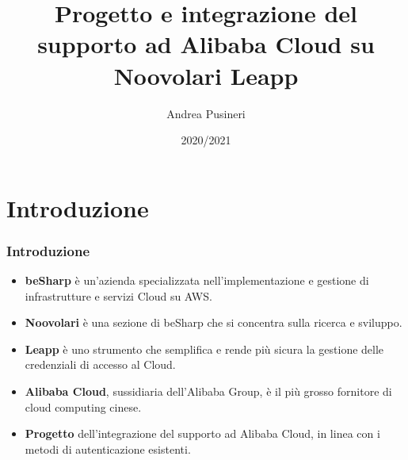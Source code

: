 \documentclass{beamer}
\title{Progetto e integrazione del supporto ad Alibaba Cloud su Noovolari Leapp}
\author{Andrea Pusineri}
\institute{Università di Pavia}
\date{2020/2021}
\begin{document}
\frame{\titlepage}
\section{Introduzione}
\begin{frame}
 \frametitle{Introduzione}
  \begin{itemize}
  \item<1-> \textbf{beSharp} è un’azienda specializzata nell’implementazione e gestione di infrastrutture e servizi Cloud su AWS.
  \item<2-> \textbf{Noovolari} è una sezione di beSharp che si concentra sulla ricerca e sviluppo.
  \item<3-> \textbf{Leapp} è uno strumento che semplifica e rende più sicura la gestione delle credenziali di accesso al Cloud.
  \item<4-> \textbf{Alibaba Cloud}, sussidiaria dell’Alibaba Group, è il più grosso fornitore di cloud computing cinese.
  \item<5-> \textbf{Progetto} dell'integrazione del supporto ad Alibaba Cloud, in linea con i metodi di autenticazione esistenti.
 \end{itemize}
\end{frame}
\end{document}
